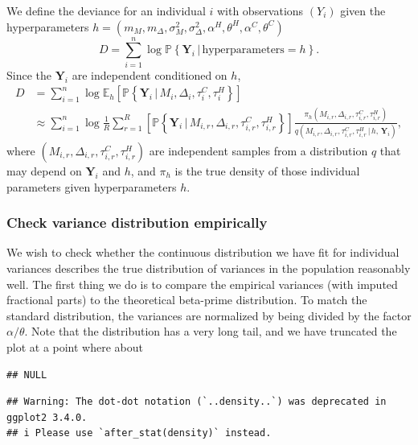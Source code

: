 \documentclass[
]{article}
\begin{document}
We define the deviance for an individual \(i\) with observations
\((Y_i)\) given the hyperparameters
\(h=(m_M,m_\Delta,\sigma^2_M,\sigma^2_\Delta,\alpha^H,\theta^H,\alpha^C,\theta^C)\)
\[
  D= \sum_{i=1}^n \log \mathbb{P}\left\{ \mathbf{Y}_{i}\,|\, \text{hyperparameters}=h\right\}.
\] \newcommand{\wtb}{\widetilde\mathbf} Since the \(\mathbf{Y}_i\) are
independent conditioned on \(h\), \begin{align*}
D&= \sum_{i=1}^n \log \mathbb{E}_h\left[ \mathbb{P}\left\{ \mathbf{Y}_i \, |\, M_i,\Delta_i,\tau_i^{C},\tau_i^H \right\} \right]\\
    &\approx \sum_{i=1}^n \log \frac1R\sum_{r=1}^R \left[ \mathbb{P}\left\{ \mathbf{Y}_i \, |\, M_{i,r},\Delta_{i,r},\tau_{i,r}^{C},\tau_{i,r}^{H} \right\}\right] \frac{\pi_h(M_{i,r},\Delta_{i,r},\tau_{i,r}^{C},\tau_{i,r}^{H} )}{q(M_{i,r},\Delta_{i,r},\tau_{i,r}^{C},\tau_{i,r}^{H} \, | \, h,\, \mathbf{Y}_i)},
\end{align*} where
\((M_{i,r},\Delta_{i,r},\tau_{i,r}^{C},\tau_{i,r}^{H})\) are independent
samples from a distribution \(q\) that may depend on \(\mathbf{Y}_i\)
and \(h\), and \(\pi_h\) is the true density of those individual
parameters given hyperparameters \(h\).

\hypertarget{check-variance-distribution-empirically}{%
\subsubsection{Check variance distribution
empirically}\label{check-variance-distribution-empirically}}

We wish to check whether the continuous distribution we have fit for
individual variances describes the true distribution of variances in the
population reasonably well. The first thing we do is to compare the
empirical variances (with imputed fractional parts) to the theoretical
beta-prime distribution. To match the standard distribution, the
variances are normalized by being divided by the factor
\(\alpha/\theta\). Note that the distribution has a very long tail, and
we have truncated the plot at a point where about

\begin{verbatim}
## NULL
\end{verbatim}

\begin{verbatim}
## Warning: The dot-dot notation (`..density..`) was deprecated in ggplot2 3.4.0.
## i Please use `after_stat(density)` instead.
\end{verbatim}
\end{document}
